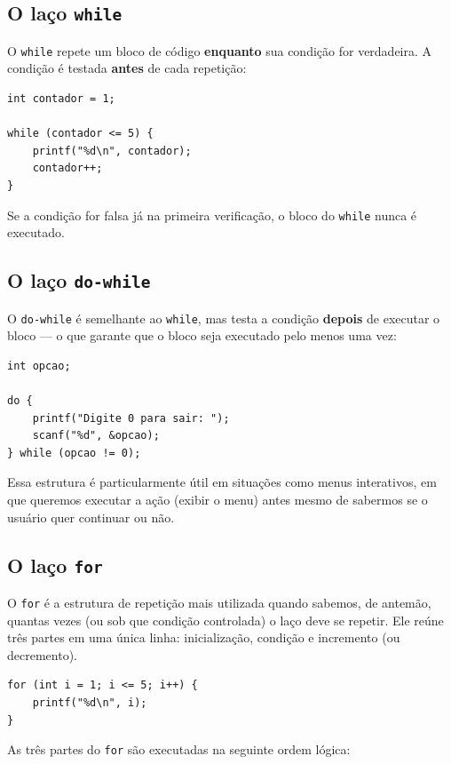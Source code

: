 \subsection{O laço \texttt{while}}

O \texttt{while} repete um bloco de código \textbf{enquanto} sua condição for verdadeira. A condição é testada \textbf{antes} de cada repetição:

\begin{lstlisting}
int contador = 1;

while (contador <= 5) {
    printf("%d\n", contador);
    contador++;
}
\end{lstlisting}

Se a condição for falsa já na primeira verificação, o bloco do \texttt{while} nunca é executado.

\subsection{O laço \texttt{do-while}}

O \texttt{do-while} é semelhante ao \texttt{while}, mas testa a condição \textbf{depois} de executar o bloco — o que garante que o bloco seja executado pelo menos uma vez:

\begin{lstlisting}
int opcao;

do {
    printf("Digite 0 para sair: ");
    scanf("%d", &opcao);
} while (opcao != 0);
\end{lstlisting}

Essa estrutura é particularmente útil em situações como menus interativos, em que queremos executar a ação (exibir o menu) antes mesmo de sabermos se o usuário quer continuar ou não.

\subsection{O laço \texttt{for}}

O \texttt{for} é a estrutura de repetição mais utilizada quando sabemos, de antemão, quantas vezes (ou sob que condição controlada) o laço deve se repetir. Ele reúne três partes em uma única linha: inicialização, condição e incremento (ou decremento).

\begin{lstlisting}
for (int i = 1; i <= 5; i++) {
    printf("%d\n", i);
}
\end{lstlisting}

As três partes do \texttt{for} são executadas na seguinte ordem lógica:

